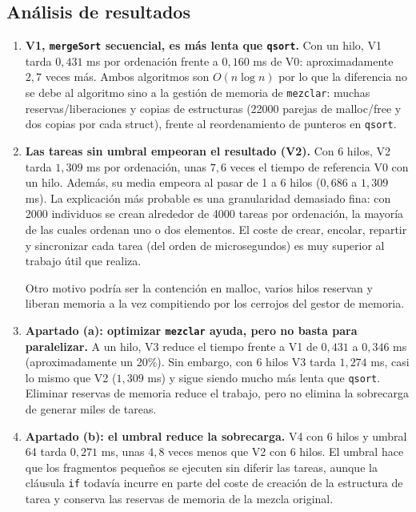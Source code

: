 \documentclass[12pt]{article}
\begin{document}
\begin{enumerate}
\subsection*{Análisis de resultados}
 
\begin{enumerate}
    \item \textbf{V1, \texttt{mergeSort} secuencial, es más lenta que \texttt{qsort}.} Con un hilo, 
    V1 tarda $0,431$ ms por ordenación frente a $0,160$ ms de V0: aproximadamente $2,7$ veces más. 
    Ambos algoritmos son $O(n \log n)$ por lo que la diferencia no se debe al algoritmo sino a la gestión de memoria de \texttt{mezclar}: muchas reservas/liberaciones 
    y copias de estructuras (22000 parejas de malloc/free y dos copias por cada struct), frente al reordenamiento de punteros en \texttt{qsort}.
 
    \item \textbf{Las tareas sin umbral empeoran el resultado (V2).} Con 6 hilos, V2 tarda $1,309$ ms por ordenación, 
    unas $7,6$ veces el tiempo de referencia V0 con un hilo. Además, su media empeora al pasar de 1 a 6 hilos ($0,686$ a $1,309$ ms).
     La explicación más probable es una granularidad demasiado fina: con 2000 individuos se crean alrededor de 4000 tareas por
      ordenación, la mayoría de las cuales ordenan uno o dos elementos. El coste
de crear, encolar, repartir y sincronizar cada tarea (del orden de microsegundos) es
muy superior al trabajo útil que realiza. 

    Otro motivo podría ser la contención en malloc, varios hilos reservan y liberan memoria a la vez compitiendo por los cerrojos del gestor de memoria. 

 
    \item \textbf{Apartado (a): optimizar \texttt{mezclar} ayuda, pero no basta para paralelizar.} A un hilo, V3 reduce el tiempo frente a V1 de $0,431$ a $0,346$ ms (aproximadamente un 20\%). Sin embargo, con 6 hilos V3 tarda $1,274$ ms, casi lo mismo que V2 ($1,309$ ms) y sigue siendo mucho más lenta que \texttt{qsort}. Eliminar reservas de memoria reduce el trabajo, pero no elimina la sobrecarga de generar miles de tareas.
 
    \item \textbf{Apartado (b): el umbral reduce la sobrecarga.} V4 con 6 hilos y umbral 64 tarda $0,271$ ms, unas $4,8$ veces menos que V2 con 6 hilos. El umbral hace que los fragmentos pequeños se ejecuten sin diferir las tareas, aunque la cláusula \texttt{if} todavía incurre en parte del coste de creación de la estructura de tarea y conserva las reservas de memoria de la mezcla original.
 

\end{enumerate}
\end{enumerate}
\end{document}
